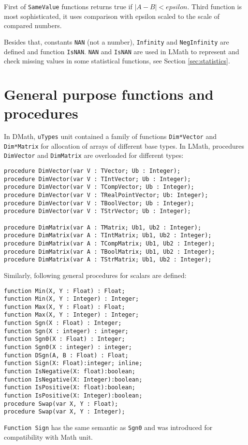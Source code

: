 \documentclass[12pt,a4paper,oneside]{article}
\newcommand{\code}[1]{\texttt{#1}}
\begin{document}
First of \code{SameValue} functions returns true if $\left| A - B \right| < epsilon$. Third function is most sophisticated, it uses comparison with epsilon scaled to the scale of compared numbers. 

Besides that, constants \code{NAN} (not a number), \code{Infinity} and \code{NegInfinity} are defined and function \code{IsNAN}. \code{NAN} and \code{IsNAN} are used in LMath to represent and check missing values in some statistical functions, see Section \ref{sec:statistics}.
\section{General purpose functions and procedures}
In DMath, \code{uTypes} unit contained a family of functions \code{Dim*Vector} and \code{Dim*Matrix} for allocation of arrays of different base types. In LMath, procedures \code{DimVector} and \code{DimMatrix} are overloaded for different types:
\begin{verbatim}
procedure DimVector(var V : TVector; Ub : Integer); 
procedure DimVector(var V : TIntVector; Ub : Integer);
procedure DimVector(var V : TCompVector; Ub : Integer);
procedure DimVector(var V : TRealPointVector; Ub: Integer);
procedure DimVector(var V : TBoolVector; Ub : Integer);
procedure DimVector(var V : TStrVector; Ub : Integer); 	

procedure DimMatrix(var A : TMatrix; Ub1, Ub2 : Integer);
procedure DimMatrix(var A : TIntMatrix; Ub1, Ub2 : Integer);
procedure DimMatrix(var A : TCompMatrix; Ub1, Ub2 : Integer);
procedure DimMatrix(var A : TBoolMatrix; Ub1, Ub2 : Integer);
procedure DimMatrix(var A : TStrMatrix; Ub1, Ub2 : Integer);
\end{verbatim}
Similarly, following general procedures for scalars are defined:
\begin{verbatim}
function Min(X, Y : Float) : Float;
function Min(X, Y : Integer) : Integer;
function Max(X, Y : Float) : Float;
function Max(X, Y : Integer) : Integer;
function Sgn(X : Float) : Integer;
function Sgn(X : integer) : integer; 
function Sgn0(X : Float) : Integer;
function Sgn0(X : integer) : integer;
function DSgn(A, B : Float) : Float;
function Sign(X: Float):integer; inline;
function IsNegative(X: float):boolean;
function IsNegative(X: Integer):boolean;
function IsPositive(X: float):boolean;
function IsPositive(X: Integer):boolean; 
procedure Swap(var X, Y : Float);
procedure Swap(var X, Y : Integer);
\end{verbatim}
\code{Function Sign} has the same semantic as \code{Sgn0} and was introduced for compatibility with Math unit.
\end{document}
